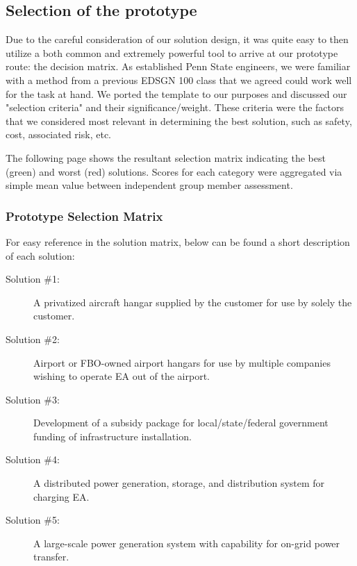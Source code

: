 \documentclass[../main.tex]{subfiles}
\begin{document}
\subsection{Selection of the prototype}
Due to the careful consideration of our solution design, it was quite easy to then utilize a both common and extremely powerful tool to arrive at our prototype route: the decision matrix. As established Penn State engineers, we were familiar with a method from a previous EDSGN 100 class that we agreed could work well for the task at hand. We ported the template to our purposes and discussed our "selection criteria" and their significance/weight. These criteria were the factors that we considered most relevant in determining the best solution, such as safety, cost, associated risk, etc. \par

The following page shows the resultant selection matrix indicating the best (green) and worst (red) solutions. Scores for each category were aggregated via simple mean value between independent group member assessment.\par

\newpage
\subsubsection{Prototype Selection Matrix}
\noindent For easy reference in the solution matrix, below can be found a short description of each solution:
\begin{singlespace}
\begin{description}
    \item[Solution \#1:] A privatized aircraft hangar supplied by the customer for use by solely the customer.
    \item[Solution \#2:] Airport or FBO-owned airport hangars for use by multiple companies wishing to operate EA out of the airport.
    \item[Solution \#3:] Development of a subsidy package for local/state/federal government funding of infrastructure installation.
    \item[Solution \#4:] A distributed power generation, storage, and distribution system for charging EA.
    \item[Solution \#5:] A large-scale power generation system with capability for on-grid power transfer.
\end{description}
\end{singlespace}
\end{document}
